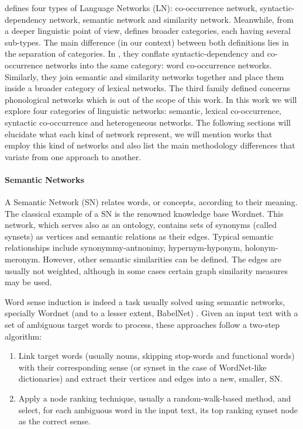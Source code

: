 \cite{Mihalcea2011} defines four types of Language Networks (LN): co-occurrence network, syntactic-dependency network, semantic network and similarity network. Meanwhile, from a deeper linguistic point of view, \cite{Choudhury2009} defines broader categories, each having several sub-types. The main difference (in our context) between both definitions lies in the separation of categories. In \cite{Choudhury2009}, they conflate syntactic-dependency and co-occurrence networks into the same  category: word co-occurrence networks. Similarly, they join semantic and similarity networks together and place them inside a broader category of lexical networks. The third  family  defined concerns phonological networks which is out of the scope of this work. In this work we will explore four categories of linguistic networks: semantic, lexical co-occurrence, syntactic co-occurrence and heterogeneous networks. The following sections will elucidate what each kind of network represent, we will mention works that employ this kind of networks and also list the main methodology differences that  variate from one approach to another. 

\paragraph{Semantic Networks}
A Semantic Network (SN) relates words, or concepts, according to their meaning. The classical example of a SN is the renowned knowledge base Wordnet. This network, which serves also as an ontology, contains sets of synonyms (called synsets) as vertices and semantic relations as their edges. Typical semantic relationships include synonymmy-antnonimy, hypernym-hyponym, holonym-meronym. However, other semantic similarities can be defined. The edges are usually not weighted, although in some cases certain graph similarity measures may be used.

Word sense induction is indeed a task usually solved using semantic networks, specially Wordnet (and to a lesser extent, BabelNet) \cite{2004.Mihalcea.SemanticNetworkPageRank,2007.Sinha.Mihalcea.Unsupervised,2007.Tsatsaronis.WSDwithSpreading,2007.Navigli.GraphConnectivity,2008.Agirre.Multilingual,2008.Klapaftis.WSIUsingCollocations,2009.Agirre.PersonalizedPageRankWSD,2010.Klapaftis.WSD.WSD.HierarchicalGraphs,2010.Siberer.GraphCooccurrenceWSD,2014.Moro.Navigli.EntityLinking_WSD}. Given an input text with a set of ambiguous target words to process, these approaches follow a two-step algorithm:
\begin{enumerate}
\item Link target words (usually nouns, skipping stop-words and functional words) with their corresponding  sense (or synset in the case of WordNet-like dictionaries) and extract their vertices and edges into a new, smaller, SN. 
\item Apply a node ranking technique, usually a random-walk-based method, and select, for each ambiguous word in the input text,  its top ranking synset node as the correct sense.
\end{enumerate}

